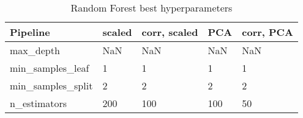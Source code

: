 \begin{table}[!htb]
\caption{Random Forest best hyperparameters}
\label{table-random-forest-params}
\centering
\begin{tabular}{lllll}
\toprule
Pipeline & scaled & corr, scaled & PCA & corr, PCA \\
\midrule
max\_depth & NaN & NaN & NaN & NaN \\
min\_samples\_leaf & 1 & 1 & 1 & 1 \\
min\_samples\_split & 2 & 2 & 2 & 2 \\
n\_estimators & 200 & 100 & 100 & 50 \\
\bottomrule
\end{tabular}
\end{table}
